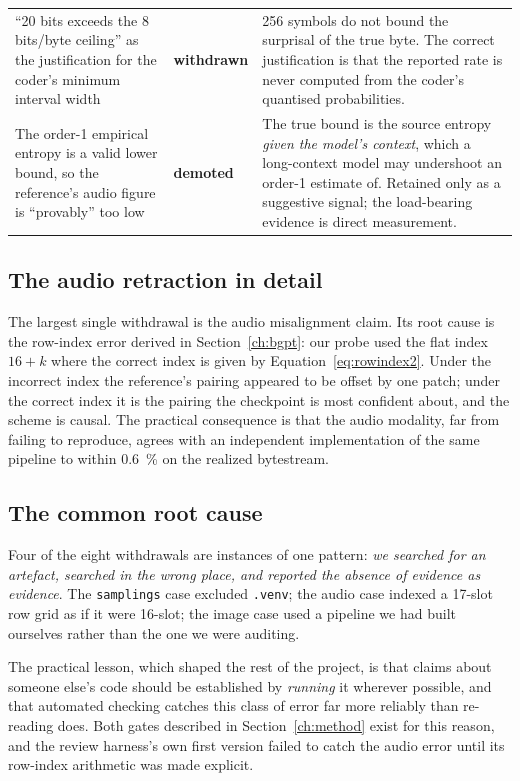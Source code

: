 \documentclass[11pt,a4paper]{article}
\newcommand{\code}[1]{\texttt{\small #1}}
\begin{document}
\begin{table}[htbp]
\begin{tabularx}{\textwidth}{L{4.1cm}L{1.6cm}X}
``20 bits exceeds the 8 bits/byte ceiling'' as the justification for the coder's
minimum interval width & \textbf{withdrawn} & 256 symbols do not bound the
  surprisal of the true byte. The correct justification is that the reported rate
  is never computed from the coder's quantised probabilities. \\
The order-1 empirical entropy is a valid lower bound, so the reference's audio
figure is ``provably'' too low & \textbf{demoted} & The true bound is the source
  entropy \emph{given the model's context}, which a long-context model may
  undershoot an order-1 estimate of. Retained only as a suggestive signal; the
  load-bearing evidence is direct measurement. \\
\bottomrule
\end{tabularx}
\end{table}

\subsection{The audio retraction in detail}
\label{sec:retract-audio}

The largest single withdrawal is the audio misalignment claim. Its root cause is
the row-index error derived in Section~\ref{ch:bgpt}: our probe used the flat
index $16+k$ where the correct index is given by Equation~\eqref{eq:rowindex2}.
Under the incorrect index the reference's pairing appeared to be offset by one
patch; under the correct index it is the pairing the checkpoint is most confident
about, and the scheme is causal. The practical consequence is that the audio
modality, far from failing to reproduce, agrees with an independent
implementation of the same pipeline to within \SI{0.6}{\percent} on the realized
bytestream.

\subsection{The common root cause}

Four of the eight withdrawals are instances of one pattern: \emph{we searched for
an artefact, searched in the wrong place, and reported the absence of evidence as
evidence}. The \code{samplings} case excluded \code{.venv}; the audio case indexed
a 17-slot row grid as if it were 16-slot; the image case used a pipeline we had
built ourselves rather than the one we were auditing.

The practical lesson, which shaped the rest of the project, is that claims about
someone else's code should be established by \emph{running} it wherever possible,
and that automated checking catches this class of error far more reliably than
re-reading does. Both gates described in Section~\ref{ch:method} exist for this
reason, and the review harness's own first version failed to catch the audio error
until its row-index arithmetic was made explicit.
\end{document}
